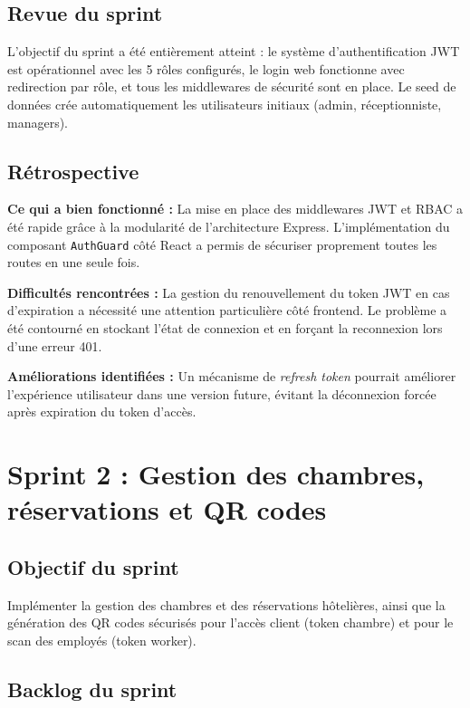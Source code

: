 \subsection{Revue du sprint}

L'objectif du sprint a été entièrement atteint : le système d'authentification JWT est opérationnel avec les 5 rôles configurés, le login web fonctionne avec redirection par rôle, et tous les middlewares de sécurité sont en place. Le seed de données crée automatiquement les utilisateurs initiaux (admin, réceptionniste, managers).

\subsection{Rétrospective}

\textbf{Ce qui a bien fonctionné :} La mise en place des middlewares JWT et RBAC a été rapide grâce à la modularité de l'architecture Express. L'implémentation du composant \texttt{AuthGuard} côté React a permis de sécuriser proprement toutes les routes en une seule fois.

\textbf{Difficultés rencontrées :} La gestion du renouvellement du token JWT en cas d'expiration a nécessité une attention particulière côté frontend. Le problème a été contourné en stockant l'état de connexion et en forçant la reconnexion lors d'une erreur 401.

\textbf{Améliorations identifiées :} Un mécanisme de \textit{refresh token} pourrait améliorer l'expérience utilisateur dans une version future, évitant la déconnexion forcée après expiration du token d'accès.

\section{Sprint 2 : Gestion des chambres, réservations et QR codes}
\label{sec:sprint2}

\subsection{Objectif du sprint}

Implémenter la gestion des chambres et des réservations hôtelières, ainsi que la génération des QR codes sécurisés pour l'accès client (token chambre) et pour le scan des employés (token worker).

\subsection{Backlog du sprint}

